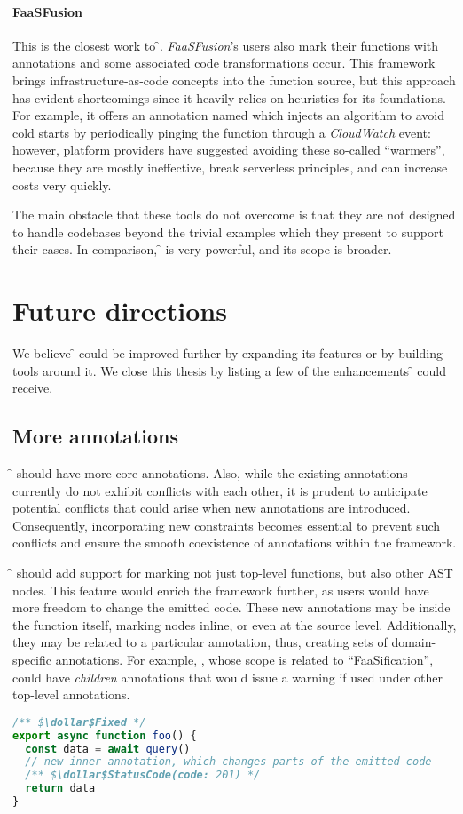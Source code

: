 \paragraph{\textbf{FaaSFusion} \cite{faasfusion}}
This is the closest work to \f{}.
\textit{FaaSFusion}'s users also mark their functions with annotations
and some associated code transformations occur.
This framework brings infrastructure-as-code concepts into the function source,
but this approach has evident shortcomings since it heavily relies on heuristics for its foundations.
For example, it offers an annotation named  which
injects an algorithm to avoid cold starts by periodically pinging the function
through a \textit{CloudWatch} event:
however, platform providers have suggested avoiding these so-called ``warmers'',
because they are mostly ineffective, break serverless principles, and can increase costs very quickly.

The main obstacle that these tools do not overcome is that they are
not designed to handle codebases beyond the trivial examples
which they present to support their cases.
In comparison, \f{} is very powerful, and its scope is broader.

\section{Future directions}

We believe \f{} could be improved further by expanding its features
or by building tools around it.
We close this thesis by listing a few of the enhancements \f{} could receive.

\subsection{More annotations}

\f{} should have more core annotations.
Also, while the existing annotations currently do not exhibit conflicts with each other,
it is prudent to anticipate potential conflicts that could arise when new annotations are introduced.
Consequently, incorporating new constraints becomes essential to prevent such
conflicts and ensure the smooth coexistence of annotations within the framework.

\f{} should add support for marking not just top-level functions, but also other AST nodes.
This feature would enrich the framework further, as users would have more freedom
to change the emitted code. These new annotations may be inside the function itself,
marking nodes inline, or even at the source level. Additionally, they may be related to a particular annotation,
thus, creating sets of domain-specific annotations.
For example, , whose scope is related to ``FaaSification'',
could have \textit{children} annotations that would issue a warning if used under other top-level annotations.
\begin{lstlisting}[language=javascript]
/** $\dollar$Fixed */
export async function foo() {
  const data = await query()
  // new inner annotation, which changes parts of the emitted code
  /** $\dollar$StatusCode(code: 201) */
  return data
}
\end{lstlisting}

